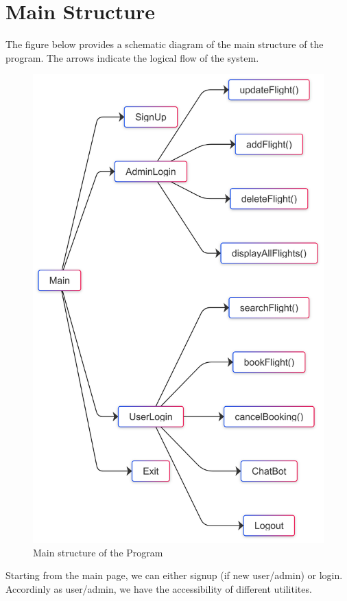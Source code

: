 \documentclass[a4paper]{scrartcl}
\begin{document}
\section{Main Structure}
The figure below provides a schematic diagram of the main structure of the program. The arrows indicate the logical flow of the system.
\begin{figure}[H]
    \centering
    \includegraphics[scale=0.1]{main structure.png}
    \caption{Main structure of the Program}
\end{figure}
\noindent
Starting from the main page, we can either signup (if new user/admin) or login. Accordinly as user/admin, we have the accessibility of different utilitites. 
\end{document}
